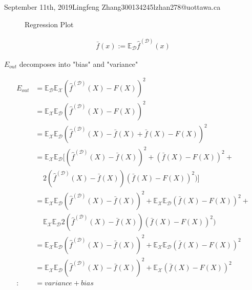 \documentclass{article}
\begin{document}
\begin{lecture}{September 11th, 2019}{Lingfeng Zhang}{300134245}{lzhan278@uottawa.ca}
\begin{figure}[ht!]
\centering
{}
\caption{Regression Plot}
\label{fig:regressionPlot}
\end{figure}

\begin{eqnarray}
\bar f(x) := \mathbb{E} _\mathcal{D}\hat f^{(\mathcal{D})}(x)
\end{eqnarray}

$E_{out}$ decomposes into "bias" and "variance"

\begin{align*}
E_{out} &= \mathbb{E} _\mathcal{D} \mathbb{E} _\mathcal{X}(\hat f^{(\mathcal{D})}(X) - F(X))^2 \\
&= \mathbb{E} _\mathcal{X} \mathbb{E} _\mathcal{D}(\hat f^{(\mathcal{D})}(X) - F(X))^2 \\
&= \mathbb{E} _\mathcal{X} \mathbb{E} _\mathcal{D}(\hat f^{(\mathcal{D})}(X) - \bar f(X) +\bar f(X) - F(X))^2 \\
&= \mathbb{E} _\mathcal{X} \mathbb{E} _\mathcal{D} [ (\hat f^{(\mathcal{D})}(X) - \bar f(X))^2 +(\bar f(X) - F(X))^2 +\\ & \>\>\>\>\> 2(\hat f^{(\mathcal{D})}(X) - \bar f(X))(\bar f(X) - F(X))^2) ] \\
&= \mathbb{E} _\mathcal{X} \mathbb{E} _\mathcal{D}(\hat f^{(\mathcal{D})}(X) - \bar f(X))^2 +  \mathbb{E} _\mathcal{X} \mathbb{E} _\mathcal{D}(\bar f(X) - F(X))^2 + \\ & \>\>\>\>\> \mathbb{E} _\mathcal{X} \mathbb{E} _\mathcal{D}2(\hat f^{(\mathcal{D})}(X) - \bar f(X))(\bar f(X) - F(X))^2) \\
&= \mathbb{E} _\mathcal{X} \mathbb{E} _\mathcal{D}(\hat f^{(\mathcal{D})}(X) - \bar f(X))^2 +  \mathbb{E} _\mathcal{X} \mathbb{E} _\mathcal{D}(\bar f(X) - F(X))^2 \\
&= \mathbb{E} _\mathcal{X} \mathbb{E} _\mathcal{D}(\hat f^{(\mathcal{D})}(X) - \bar f(X))^2 +  \mathbb{E} _\mathcal{X} (\bar f(X) - F(X))^2 \\
:&= variance + bias 
\end{align*}


\end{lecture}
\end{document}
